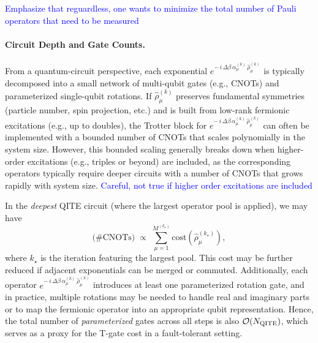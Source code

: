 \documentclass[aip,jcp,amsmath,amssymb, reprint]{revtex4-1}
\newcommand{\note}[2]{%
  \ifthenelse{\boolean{shownotes}}%
    {\textcolor{#1}{#2}}%
    {}%
}
\begin{document}
\note{blue}{Emphasize that reguardless, one wants to minimize the total number of Pauli operators that need to be measured}


\paragraph{Circuit Depth and Gate Counts.}
From a quantum-circuit perspective, each exponential $e^{-\,i\,\Delta \beta\,\alpha_\mu^{(k)} \,\hat{\rho}_\mu^{(k)}}$ is typically decomposed into a small network of multi-qubit gates (e.g., CNOTs) and parameterized single-qubit rotations. If $\hat{\rho}_\mu^{(k)}$ preserves fundamental symmetries (particle number, spin projection, etc.) and is built from low-rank fermionic excitations (e.g., up to doubles), the Trotter block for $e^{-\,i\,\Delta \beta\,\alpha_\mu^{(k)} \,\hat{\rho}_\mu^{(k)}}$ can often be implemented with a bounded number of CNOTs that scales polynomially in the system size. However, this bounded scaling generally breaks down when higher-order excitations (e.g., triples or beyond) are included, as the corresponding operators typically require deeper circuits with a number of CNOTs that grows rapidly with system size.
\note{blue}{Careful, not true if higher order excitations are included}
In the \textit{deepest} QITE circuit (where the largest operator pool is applied), we may have 
\[
\text{(\# CNOTs)} \;\propto\; \sum_{\mu=1}^{M^{(k_\star)}} \!\!\text{cost}(\hat{\rho}_\mu^{(k_\star)}),
\]
where $k_\star$ is the iteration featuring the largest pool. This cost may be further reduced if adjacent exponentials can be merged or commuted.\cite{mcardle2020quantum} Additionally, each operator \(e^{-\,i\,\Delta \beta\,\alpha_\mu^{(k)} \,\hat{\rho}_\mu^{(k)}}\) introduces at least one parameterized rotation gate, and in practice, multiple rotations may be needed to handle real and imaginary parts or to map the fermionic operator into an appropriate qubit representation. Hence, the total number of \textit{parameterized} gates across all steps is also $\mathcal{O}(N_{\rm{QITE}})$, which serves as a proxy for the T-gate cost in a fault-tolerant setting. 
\end{document}
